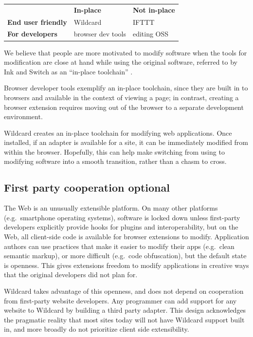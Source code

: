 \documentclass[english,submission]{programming}
\begin{document}
\begin{longtable}[]{@{}lll@{}}
\toprule
\endhead
& \textbf{In-place} & \textbf{Not in-place}\tabularnewline
\textbf{End user friendly} & Wildcard & IFTTT\tabularnewline
\textbf{For developers} & browser dev tools & editing OSS\tabularnewline
\bottomrule
\end{longtable}

We believe that people are more motivated to modify software when the
tools for modification are close at hand while using the original
software, referred to by Ink and Switch as an ``in-place toolchain''
\autocite{inkandswitch2019}.

Browser developer tools exemplify an in-place toolchain, since they are
built in to browsers and available in the context of viewing a page; in
contrast, creating a browser extension requires moving out of the
browser to a separate development environment.

Wildcard creates an in-place toolchain for modifying web applications.
Once installed, if an adapter is available for a site, it can be
immediately modified from within the browser. Hopefully, this can help
make switching from using to modifying software into a smooth
transition, rather than a chasm to cross.

\hypertarget{first-party-cooperation-optional}{%
\subsection{First party cooperation
optional}\label{first-party-cooperation-optional}}

The Web is an unusually extensible platform. On many other platforms
(e.g.~smartphone operating systems), software is locked down unless
first-party developers explicitly provide hooks for plugins and
interoperability, but on the Web, all client-side code is available for
browser extensions to modify. Application authors can use practices that
make it easier to modify their apps (e.g.~clean semantic markup), or
more difficult (e.g.~code obfuscation), but the default state is
openness. This gives extensions freedom to modify applications in
creative ways that the original developers did not plan for.

Wildcard takes advantage of this openness, and does not depend on
cooperation from first-party website developers. Any programmer can add
support for any website to Wildcard by building a third party adapter.
This design acknowledges the pragmatic reality that most sites today
will not have Wildcard support built in, and more broadly do not
prioritize client side extensibility.
\end{document}
